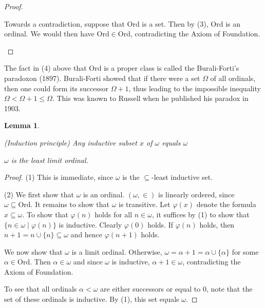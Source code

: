\documentclass[a4paper, 11pt]{amsart}
\newtheorem{lemma}[lemma]{Lemma}
\theoremstyle{remark}
\newcommand{\Ord}{\mathrm{Ord}}
\newenvironment{enumerate-(1)}{\begin{enumerate}[label={\upshape (\arabic*)}, leftmargin=2pc]}{\end{enumerate}}
\begin{document}
\begin{proof}
\begin{enumerate-(1)}
\item 
Towards a contradiction, suppose that $\Ord$ is a set. 
Then by (3), $\Ord$ is an ordinal. 
We would then have $\Ord\in \Ord$, contradicting the Axiom of Foundation. 
\end{enumerate-(1)} 
\end{proof} 


The fact in (4) above that $\Ord$ is a proper class is called the Burali-Forti's paradoxon (1897). 
Burali-Forti showed that if there were a set $\Omega$ of all ordinals, then one could form its successor $\Omega+1$, thus leading to the impossible inequality $\Omega<\Omega+1\leq \Omega$. 
This was known to Russell when he published his paradox in 1903. 


\begin{lemma} \ 
\begin{enumerate-(1)} 
\item 
\emph{(Induction principle)} 
Any inductive subset $x$ of $\omega$ equals $\omega$ 
\item 
$\omega$ is the least limit ordinal. 
\end{enumerate-(1)} 
\end{lemma} 
\begin{proof} 
(1) 
This is immediate, since $\omega$ is the $\subseteq$-least inductive set. 

(2) 
We first show that $\omega$ is an ordinal. 
$(\omega,\in)$ is linearly ordered, since $\omega \subseteq \Ord$. 
It remains to show that $\omega$ is transitive. 
Let $\varphi(x)$ denote the formula  $x \subseteq \omega$. 
To show that $\varphi(n)$ holds for all $n\in\omega$, it suffices by (1) to show that $\{ n\in \omega \mid \varphi(n) \}$ is inductive. 
Clearly $\varphi(0)$ holds. 
If $\varphi(n)$ holds, then $n+1= n \cup \{n\} \subseteq \omega$ and hence $\varphi(n+1)$ holds. 

We now show that $\omega$ is a limit ordinal. 
Otherwise, $\omega=\alpha+1=\alpha \cup \{ \alpha\}$ for some $\alpha\in \Ord$. 
Then $\alpha\in \omega$ and since $\omega$ is inductive, $\alpha+1\in \omega$, contradicting the Axiom of Foundation. 

To see that all ordinals $\alpha<\omega$ are either successors or equal to $0$, note that the set of these ordinals is inductive. 
By (1), this set equals $\omega$. 
\end{proof} 
\end{document}
